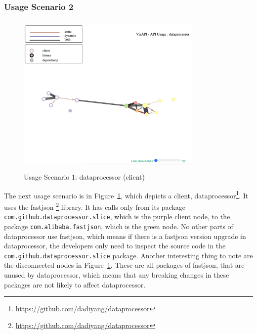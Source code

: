 \subsubsection{Usage Scenario 2}
\begin{figure}[h]
\begin{center}
\includegraphics[scale=1,width=9cm,height=8cm]{images/usage-scenario2.png}
\caption{Usage Scenario 1: dataprocessor (client)}
\label{fig:usagescenario2}
\end{center}
\end{figure}

The next usage scenario is in Figure~\ref{fig:usagescenario2}, which depicts a client, dataprocessor\footnote{\url{https://github.com/dadiyang/dataprocessor}\label{dataprocessor}}. It uses the fastjson \footnote{\url{https://github.com/dadiyang/dataprocessor}\label{dataprocessor}} library. It has calls only from its package \texttt{com.github.dataprocessor.slice}, which is the purple client node, to the package \texttt{com.alibaba.fastjson}, which is the green node. No other parts of dataprocessor use fastjson, which means if there is a fastjson version upgrade in dataprocessor, the developers only need to inspect the source code in the \texttt{com.github.dataprocessor.slice} package. Another interesting thing to note are the disconnected nodes in Figure~\ref{fig:usagescenario2}. These are all packages of fastjson, that are unused by dataprocessor, which means that any breaking changes in these packages are not likely to affect dataprocessor.